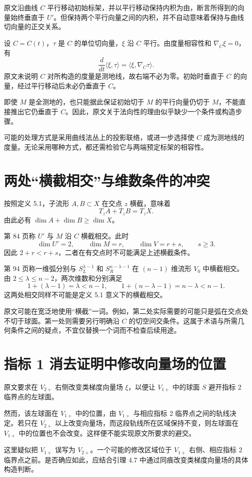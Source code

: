 原文沿曲线 $C$ 平行移动初始标架，并以平行移动保持内积为由，断言所得到的向量始终垂直于 $U'$。但保持两个平行向量之间的内积，并不自动意味着保持与曲线切向量的正交关系。

设 $C=C(t)$，$\tau$ 是 $C$ 的单位切向量，$\xi$ 沿 $C$ 平行。由度量相容性和 $\nabla_{\dot C}\xi=0$，有
\[
\frac{d}{dt}\langle\xi,\tau\rangle
=\langle\xi,\nabla_{\dot C}\tau\rangle.
\]
原文未说明 $C$ 对所构造的度量是测地线，故右端不必为零。初始时垂直于 $C$ 的向量，经过平行移动后未必仍垂直于 $C$。

即使 $M$ 是全测地的，也只能据此保证初始切于 $M$ 的平行向量仍切于 $M$，不能直接推出它仍垂直于 $C$。因此，原文关于法向性的理由似乎缺少一个条件或构造步骤。

可能的处理方式是采用曲线法丛上的投影联络，或进一步选择使 $C$ 成为测地线的度量。无论采用哪种方式，都还需检验它与两端预定标架的相容性。


\section*{两处“横截相交”与维数条件的冲突}

按照定义 5.1，子流形 $A,B\subset X$ 在交点 $z$ 横截，意味着
\[
T_zA+T_zB=T_zX.
\]
由此必有 $\dim A+\dim B\geq\dim X$。

第 84 页称 $U'$ 与 $M$ 沿 $C$ 横截相交。此时
\[
\dim U'=2,\qquad \dim M=r,\qquad
\dim V=r+s,\qquad s\geq3.
\]
因此 $2+r<r+s$，二者在有交点时不可能满足上述横截条件。

第 94 页称一维弧分别与 $S_L^{\lambda-1}$ 和 $S_R^{n-\lambda-1}$ 在 $(n-1)$ 维流形 $V_0$ 中横截相交。由 $2\leq\lambda\leq n-2$，两次维数和分别满足
\[
1+(\lambda-1)=\lambda<n-1,
\qquad
1+(n-\lambda-1)=n-\lambda<n-1.
\]
这两处相交同样不可能是定义 5.1 意义下的横截相交。

原文可能在宽泛地使用“横截”一词。例如，第二处实际需要的可能只是弧在交点处不切于球面。第一处则需要另行明确沿 $C$ 的切空间交条件。这属于术语与所需几何条件之间的疑点，不宜仅替换一个词而不检查后续用途。

\section*{指标 1 消去证明中修改向量场的位置}

原文要求在 $V_{2+}$ 右侧改变类梯度向量场 $\xi$，以便让 $V_{1+}$ 中的球面 $S$ 避开指标 2 临界点的左球面。

然而，该左球面在 $V_{1+}$ 中的位置，由 $V_{1+}$ 与相应指标 2 临界点之间的轨线决定。若只在 $V_{2+}$ 以上改变向量场，而这段轨线所在区域保持不变，则左球面在 $V_{1+}$ 中的位置也不会改变。这样便不能实现原文所要求的避交。

这里疑似把 $V_{1+}$ 误写为 $V_{2+}$。一个可能的修改区域位于 $V_{1+}$ 右侧、相应指标 2 临界点之前。是否确应如此，应结合引理 4.7 中通过同痕改变类梯度向量场的具体构造判断。

 
